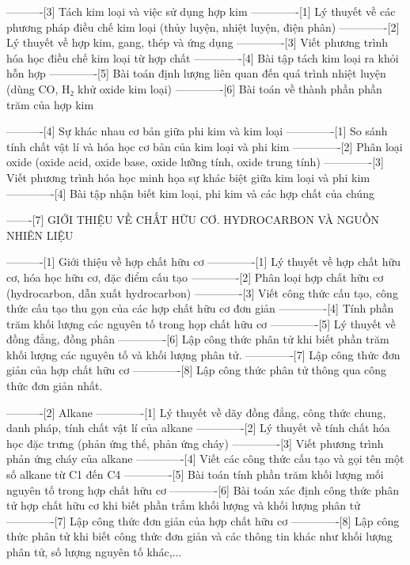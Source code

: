 ----------[3] Tách kim loại và việc sử dụng hợp kim
-------------[1] Lý thuyết về các phương pháp điều chế kim loại (thủy luyện, nhiệt luyện, điện phân)
-------------[2] Lý thuyết về hợp kim, gang, thép và ứng dụng
-------------[3] Viết phương trình hóa học điều chế kim loại từ hợp chất
-------------[4] Bài tập tách kim loại ra khỏi hỗn hợp
-------------[5] Bài toán định lượng liên quan đến quá trình nhiệt luyện (dùng CO, H₂ khử oxide kim loại)
-------------[6] Bài toán về thành phần phần trăm của hợp kim

----------[4] Sự khác nhau cơ bản giữa phi kim và kim loại
-------------[1] So sánh tính chất vật lí và hóa học cơ bản của kim loại và phi kim
-------------[2] Phân loại oxide (oxide acid, oxide base, oxide lưỡng tính, oxide trung tính)
-------------[3] Viết phương trình hóa học minh họa sự khác biệt giữa kim loại và phi kim
-------------[4] Bài tập nhận biết kim loại, phi kim và các hợp chất của chúng

-------[7] GIỚI THIỆU VỀ CHẤT HỮU CƠ. HYDROCARBON VÀ NGUỒN NHIÊN LIỆU

----------[1] Giới thiệu về hợp chất hữu cơ
-------------[1] Lý thuyết về hợp chất hữu cơ, hóa học hữu cơ, đặc điểm cấu tạo
-------------[2] Phân loại hợp chất hữu cơ (hydrocarbon, dẫn xuất hydrocarbon)
-------------[3] Viết công thức cấu tạo, công thức cấu tạo thu gọn của các hợp chất hữu cơ đơn giản
-------------[4] Tính phần trăm khối lượng các nguyên tố trong họp chất hữu cơ
-------------[5] Lý thuyết về đồng đẳng, đồng phân
-------------[6] Lập công thức phân tử khi biết phần trăm khối lượng các nguyên tố và khối lượng phân tử.
-------------[7] Lập công thức đơn giản của hợp chất hữu cơ
-------------[8] Lập công thức phân tử thông qua công thức đơn giản nhất.

----------[2] Alkane
-------------[1] Lý thuyết về dãy đồng đẳng, công thức chung, danh pháp, tính chất vật lí của alkane
-------------[2] Lý thuyết về tính chất hóa học đặc trưng (phản ứng thế, phản ứng cháy)
-------------[3] Viết phương trình phản ứng cháy của alkane
-------------[4] Viết các công thức cấu tạo và gọi tên một số alkane từ C1 đến C4
-------------[5] Bài toán tính phần trăm khối lượng mối nguyên tố trong hợp chất hữu cơ
-------------[6] Bài toán xác định công thức phân tử hợp chất hữu cơ khi biết phần trắm khối lượng và khối lượng phân tử
-------------[7] Lập công thức đơn giản của hợp chất hữu cơ
-------------[8] Lập công thức phân tử khi biết công thức đơn giản và các thông tin khác như khối lượng phân tử, số lượng nguyên tố khác,...

